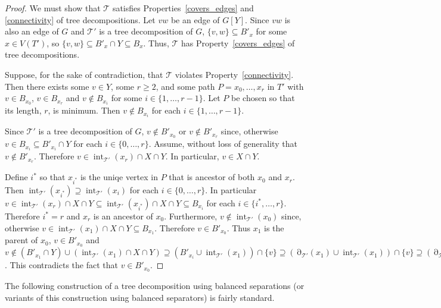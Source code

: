 \documentclass{patmorin}
\DeclareMathOperator{\interior}{int}
\DeclareMathOperator{\boundary}{\partial}
\begin{document}
\begin{proof}
  We must show that $\mathcal{T}$ satisfies Properties~\ref{covers_edges} and \ref{connectivity} of tree decompositions.
  Let $vw$ be an edge of $G[Y]$.  Since $vw$ is also an edge of $G$ and  $\mathcal{T'}$ is a tree decomposition of $G$,  $\{v,w\}\subseteq B'_x$ for some $x\in V(T')$, so $\{v,w\}\subseteq B'_x\cap Y\subseteq  B_x$. Thus, $\mathcal{T}$ has Property~\ref{covers_edges} of tree decompositions.  

  Suppose, for the sake of contradiction, that $\mathcal{T}$ violates Property~\ref{connectivity}.  Then there exists some $v\in Y$, some $r\ge 2$, and some path $P=x_0,\ldots,x_r$ in $T'$ with $v\in B_{x_0}$, $v\in B_{x_r}$ and $v\not\in B_{x_i}$ for some $i\in\{1,\ldots,r-1\}$.  Let $P$ be chosen so that its length, $r$, is minimum.  Then $v\not\in B_{x_i}$ for each $i\in\{1,\ldots,r-1\}$. 
  
  Since $\mathcal{T}'$ is a tree decomposition of $G$, $v\not\in B'_{x_0}$ or $v\not\in B'_{x_r}$ since, otherwise $v\in B_{x_i}\subseteq B'_{x_i}\cap Y$ for each $i\in\{0,\ldots,r\}$.  Assume, without loss of generality that $v\not\in B'_{x_r}$. Therefore $v\in\interior_{\mathcal{T}'}(x_r)\cap X\cap Y$.  In particular, $v\in X\cap Y$. 
  
  Define $i^*$ so that $x_{i^*}$ is the uniqe vertex in $P$ that is ancestor of both $x_0$ and $x_r$.  Then  $\interior_{\mathcal{T}'}(x_{i^*})\supseteq \interior_{\mathcal{T}'}(x_i)$ for each $i\in\{0,\ldots,r\}$.  In particular $v\in \interior_{\mathcal{T}'}(x_r)\cap X\cap Y\subseteq\interior_{\mathcal{T}'}(x_{i^*})\cap X\cap Y\subseteq B_{x_{i}}$ for each $i\in\{i^*,\ldots,r\}$.  Therefore $i^*=r$ and $x_r$ is an ancestor of $x_0$. Furthermore, $v\not\in\interior_{\mathcal{T}'}(x_0)$ since, otherwise $v\in\interior_{\mathcal{T}'}(x_1)\cap X\cap Y\subseteq B_{x_1}$. Therefore $v\in B'_{x_0}$.  Thus $x_1$ is the parent of $x_0$, $v\in B'_{x_0}$ and $v\not\in (B'_{x_1}\cap Y)\cup (\interior_{\mathcal{T}'}(x_1)\cap X\cap Y)
  \supseteq (B'_{x_i}\cup \interior_{\mathcal{T}'}(x_1))\cap\{v\}
  \supseteq (\boundary_{\mathcal{T}'}(x_1)\cup \interior_{\mathcal{T}'}(x_1))\cap\{v\} \supseteq (\boundary_{\mathcal{T}'}(x_0)\cup \interior_{\mathcal{T}'}(x_0))\cap \{v\} \supseteq B'_{x_0}\cap\{v\}$. This contradicts the fact that $v\in B'_{x_0}$.
\end{proof}


The following construction of a tree decomposition using balanced separations (or variants of this construction using balanced separators) is fairly standard.
\end{document}
